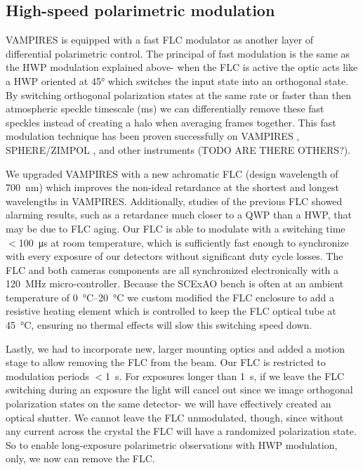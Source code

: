 \subsection{High-speed polarimetric modulation}

VAMPIRES is equipped with a fast FLC modulator as another layer of differential polarimetric control. The principal of fast modulation is the same as the HWP modulation explained above- when the FLC is active the optic acts like a HWP oriented at \ang{45} which switches the input state into an orthogonal state. By switching orthogonal polarization states at the same rate or faster than then atmospheric speckle timescale (\si{\milli\second}) we can differentially remove these fast speckles instead of creating a halo when averaging frames together. This fast modulation technique has been proven successfully on VAMPIRES \citep{norris_vampires_2015}, SPHERE/ZIMPOL \citep{schmid_spherezimpol_2018}, and other instruments (TODO ARE THERE OTHERS?).

We upgraded VAMPIRES with a new achromatic FLC (design wavelength of \SI{700}{\nano\meter}) which improves the non-ideal retardance at the shortest and longest wavelengths in VAMPIRES. Additionally, studies of the previous FLC showed alarming results, such as a retardance much closer to a QWP than a HWP, that may be due to FLC aging. Our FLC is able to modulate with a switching time $<$\SI{100}{\micro\second} at room temperature, which is sufficiently fast enough to synchronize with every exposure of our detectors without significant duty cycle losses. The FLC and both cameras components are all synchronized electronically with a \SI{120}{\mega\hertz} micro-controller. Because the SCExAO bench is often at an ambient temperature of \SIrange{0}{20}{\celsius} we custom modified the FLC enclosure to add a resistive heating element which is controlled to keep the FLC optical tube at \SI{45}{\celsius}, ensuring no thermal effects will slow this switching speed down.

Lastly, we had to incorporate new, larger mounting optics and added a motion stage to allow removing the FLC from the beam. Our FLC is restricted to modulation periods $<$\SI{1}{\second}. For exposures longer than \SI{1}{\second}, if we leave the FLC switching during an exposure the light will cancel out since we image orthogonal polarization states on the same detector- we will have effectively created an optical shutter. We cannot leave the FLC unmodulated, though, since without any current across the crystal the FLC will have a randomized polarization state. So to enable long-exposure polarimetric observations with HWP modulation, only, we now can remove the FLC.

